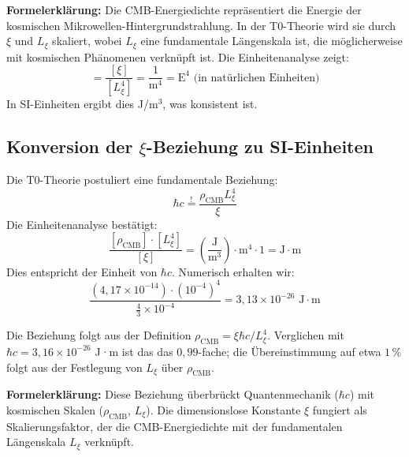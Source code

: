 	\textbf{Formelerklärung:} Die CMB-Energiedichte repräsentiert die Energie der kosmischen Mikrowellen-Hintergrundstrahlung. In der T0-Theorie wird sie durch $\xi$ und $L_\xi$ skaliert, wobei $L_\xi$ eine fundamentale Längenskala ist, die möglicherweise mit kosmischen Phänomenen verknüpft ist. Die Einheitenanalyse zeigt:
	\begin{equation}
		[\rho_{\text{CMB}}] = \frac{[\xi]}{[L_\xi^4]} = \frac{1}{\text{m}^4} = \text{E}^4 \text{ (in natürlichen Einheiten)}
	\end{equation}
	In SI-Einheiten ergibt dies J/m$^3$, was konsistent ist.
	
	\subsection{Konversion der $\xi$-Beziehung zu SI-Einheiten}
	Die T0-Theorie postuliert eine fundamentale Beziehung:
	\begin{equation}
		\hbar c \stackrel{!}{=} \frac{\rho_{\text{CMB}} L_\xi^4}{\xi}
	\end{equation}
	Die Einheitenanalyse bestätigt:
	\begin{equation}
		\frac{[\rho_{\text{CMB}}] \cdot [L_\xi^4]}{[\xi]} = \left( \frac{\text{J}}{\text{m}^3} \right) \cdot \text{m}^4 \cdot 1 = \text{J} \cdot \text{m}
	\end{equation}
	Dies entspricht der Einheit von $\hbar c$. Numerisch erhalten wir:
	\begin{equation}
		\frac{\left( 4,17 \times 10^{-14} \right) \cdot \left( 10^{-4} \right)^4}{\frac{4}{3} \times 10^{-4}} = 3,13 \times 10^{-26} \text{ J} \cdot \text{m}
	\end{equation}
	
	Die Beziehung folgt aus der Definition $\rho_{\text{CMB}} = \xi\hbar c/L_\xi^4$. Verglichen mit $\hbar c = 3,16 \times 10^{-26}$ J·m ist das das $0,99$-fache; die Übereinstimmung auf etwa $1\,\%$ folgt aus der Festlegung von $L_\xi$ über $\rho_{\text{CMB}}$.
	
	\textbf{Formelerklärung:} Diese Beziehung überbrückt Quantenmechanik ($\hbar c$) mit kosmischen Skalen ($\rho_{\text{CMB}}$, $L_\xi$). Die dimensionslose Konstante $\xi$ fungiert als Skalierungsfaktor, der die CMB-Energiedichte mit der fundamentalen Längenskala $L_\xi$ verknüpft.
	
